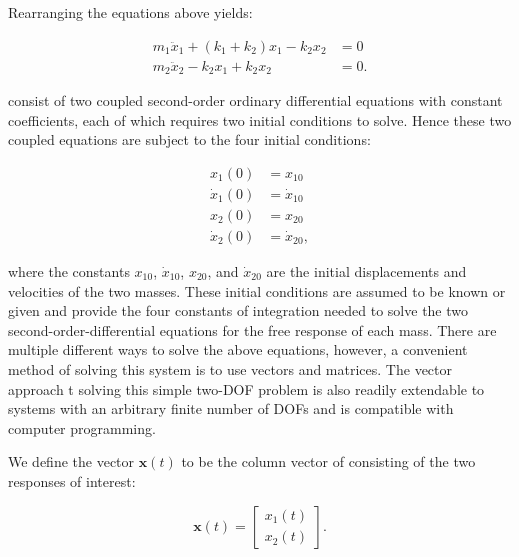   \noindent Rearranging the equations above yields:

  \begin{equation}
    \label{eq:two_dof_system_of_equations}
    \begin{aligned}
      m_{1}\ddot{x}_{1} + (k_{1} + k_{2}) x_{1} - k_{2}x_{2}  &= 0 \\
      m_{2}\ddot{x}_{2} - k_{2}x_{1} + k_{2}x_{2} &= 0.
    \end{aligned}
  \end{equation}

   consist of two coupled second-order ordinary differential equations with constant coefficients, each of which requires two initial conditions to solve. Hence these two coupled equations are subject to the four initial conditions:

  \begin{equation}
    \label{eq:two_dof_initial_conditions}
    \begin{aligned}
      x_{1}(0) &= x_{10} \\
      \dot{x}_{1}(0) &= \dot{x}_{10} \\
      x_{2}(0) &= x_{20} \\
      \dot{x}_{2}(0) &= \dot{x}_{20},
    \end{aligned}
  \end{equation}

  \noindent where the constants $x_{10}$, $\dot{x}_{10}$, $x_{20}$, and $\dot{x}_{20}$ are the initial displacements and velocities of the two masses. These initial conditions are assumed to be known or given and provide the four constants of integration needed to solve the two second-order-differential equations for the free response of each mass. There are multiple different ways to solve the above equations, however, a convenient method of solving this system is to use vectors and matrices. The vector approach t solving this simple two-DOF problem is also readily extendable to systems with an arbitrary finite number of DOFs and is compatible with computer programming.

  We define the vector $\mathbf{x}(t)$ to be the column vector of consisting of the two responses of interest:

  \begin{equation}
    \mathbf{x}(t) = 
    \begin{bmatrix}
      x_{1}(t) \\
      x_{2}(t)
    \end{bmatrix}.
  \end{equation}




